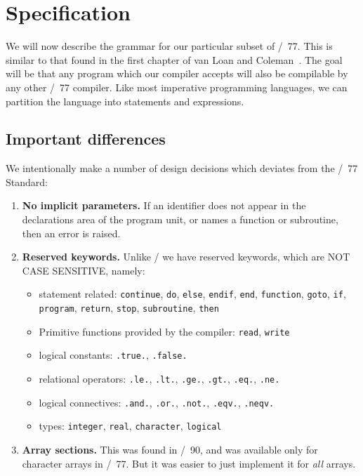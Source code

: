 \section{Specification}\label{section:specification}
We will now describe the grammar for our particular subset of \FORTRAN/~77.
This is similar to that found in the first chapter of van Loan and
Coleman~\cite{vanloan1987handbook}. The goal will be that any program
which our compiler accepts will also be compilable by any other \FORTRAN/~77 compiler.
Like most imperative programming languages, we can partition the
language into statements and expressions.

\subsection{Important differences}
We intentionally make a number of design decisions which deviates from
the \FORTRAN/~77 Standard:
\begin{enumerate}
\item\textbf{No implicit parameters.} If an identifier does not appear
  in the declarations area of the program unit, or names a function or
  subroutine, then an error is raised.
\item \textbf{Reserved keywords.} Unlike \FORTRAN/ we have reserved
  keywords, which are NOT CASE SENSITIVE, namely:
  \begin{itemize}
  \item statement related: \texttt{continue}, \texttt{do}, \texttt{else}, \texttt{endif}, \texttt{end}, \texttt{function}, \texttt{goto}, \texttt{if}, \texttt{program}, \texttt{return}, \texttt{stop}, \texttt{subroutine}, \texttt{then}
  \item Primitive functions provided by the compiler: \texttt{read}, \texttt{write}
  \item logical constants: \texttt{.true.}, \texttt{.false.}
  \item relational operators: \texttt{.le.}, \texttt{.lt.}, \texttt{.ge.}, \texttt{.gt.}, \texttt{.eq.}, \texttt{.ne.}
  \item logical connectives: \texttt{.and.}, \texttt{.or.}, \texttt{.not.}, \texttt{.eqv.}, \texttt{.neqv.}
  \item types: \texttt{integer}, \texttt{real}, \texttt{character}, \texttt{logical}
  \end{itemize}
\item\textbf{Array sections.} This was found in \FORTRAN/~90, and was
  available only for character arrays in \FORTRAN/~77. But it was easier
  to just implement it for \emph{all} arrays.
\end{enumerate}

